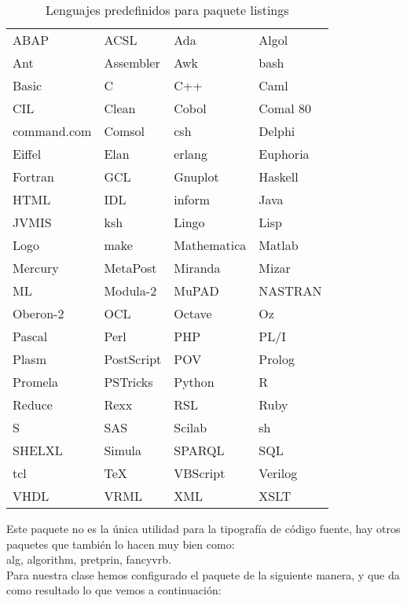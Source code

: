 	\begin{table}[h]
  		 \begin{center}
    		    
		    \begin{tabular}{|l|l|l|l|}
      		    \hline
			ABAP & ACSL & Ada & Algol \\
			Ant & Assembler &  Awk & bash \\
			Basic & C & C++ & Caml\\
			CIL & Clean & Cobol & Comal 80\\
	   		command.com & Comsol & csh & Delphi\\
			Eiffel & Elan & erlang & Euphoria\\
			Fortran & GCL & Gnuplot & Haskell\\
			HTML & IDL & inform &  Java\\
			JVMIS & ksh & Lingo & Lisp \\
			Logo & make & Mathematica  & Matlab\\
			Mercury & MetaPost & Miranda & Mizar\\
			ML & Modula-2 & MuPAD & NASTRAN\\
			Oberon-2 & OCL & Octave & Oz\\
			Pascal  & Perl & PHP & PL/I\\
			Plasm & PostScript & POV & Prolog\\
			Promela & PSTricks & Python &  R\\
			Reduce & Rexx & RSL & Ruby\\
			S & SAS & Scilab & sh\\
			SHELXL & Simula & SPARQL & SQL\\
			tcl & TeX & VBScript & Verilog\\
			VHDL  & VRML & XML & XSLT\\
		    \hline
    		    \end{tabular}
  		\end{center}
  		  \caption{Lenguajes predefinidos para paquete listings}
	 	  \label{tab:lenglist}
	       \end{table}


Este paquete no es la única utilidad para la tipografía de código fuente, hay otros paquetes que también lo hacen muy bien como:\\
alg, algorithm, pretprin, fancyvrb.\\
Para nuestra clase hemos configurado el paquete de la siguiente manera, y que da como resultado lo que vemos a continuación:
\\
\\
\\

